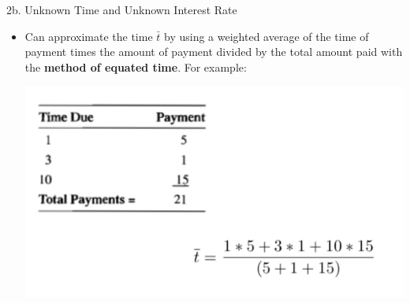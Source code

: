 \begin{CHPT_SUMM_AUTO}[label = {L.-2b}]{2b. Unknown Time and Unknown Interest Rate}
	\begin{itemize}[leftmargin = *]
		\item	Can approximate the time $\bar{t}$ by using a weighted average of the time of payment times the amount of payment divided by the total amount paid with the \textbf{method of equated time}. For example:
		\begin{center}
		\includegraphics[scale=0.5]{img/approx-time-pmt.png}
		\end{center}
	\end{itemize}
\end{CHPT_SUMM_AUTO}
